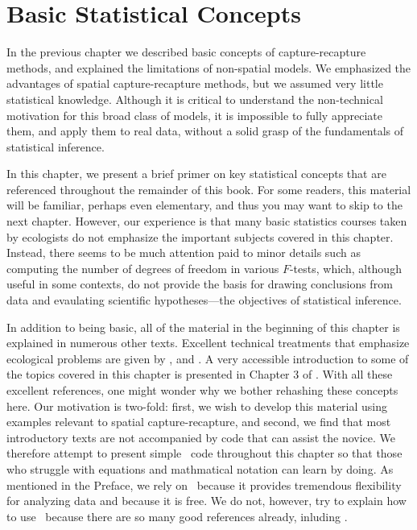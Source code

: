 \chapter{
Basic Statistical Concepts
}
\label{chapt.modeling}


\vspace{.3in}

In the previous chapter we described basic concepts of
capture-recapture methods, and explained the limitations of
non-spatial models. We emphasized the advantages of
spatial capture-recapture methods, but we assumed very little
statistical knowledge. Although it is critical to understand the
non-technical motivation for this broad class of models, it is
impossible to fully appreciate them, and apply them to real data,
without a solid grasp of the fundamentals of statistical
inference.

In this chapter, we present a brief primer on key
statistical concepts that are referenced throughout the remainder of
this book. For some readers, this material will be familiar,
perhaps even elementary, and thus you may want to skip to the next
chapter. However, our experience is that many basic statistics courses
taken by ecologists do not emphasize the important subjects covered in
this chapter. Instead, there seems to be much attention paid to
minor details such as computing the number of degrees of freedom in
various $F$-tests, which, although useful in some contexts, do not
provide the basis for drawing conclusions from data and evaulating
scientific hypotheses---the objectives of statistical inference.

In addition to being basic, all of the material in the
beginning of this chapter is explained in numerous other
texts. %
Excellent technical treatments that emphasize ecological
problems are given by
\citet{williams_etal:2002}, \citet{royle_dorazio:2008} and
\citet{link_barker:2010}. A very accessible introduction to some of the
topics covered in this chapter is presented in Chapter 3 of
\citet{mackenzie_etal:2006}. With all these excellent references, one
might wonder why we bother rehashing these concepts here. Our motivation is
two-fold: first, we wish to develop this material using examples
relevant to spatial capture-recapture, and second, we find that most
introductory texts are not accompanied by code that can
assist the novice. We therefore attempt to present simple \R~code
throughout this chapter so that those who struggle with equations and
mathmatical notation can learn by doing. As mentioned in the Preface,
we rely on \R~because it provides tremendous flexibility for analyzing
data and because it is free. We do not, however, try to explain how to
use \R~because there are so many good references already, inluding
\citet{venables_ripley:2002,bolker:2008,venables_etal:2012}.

